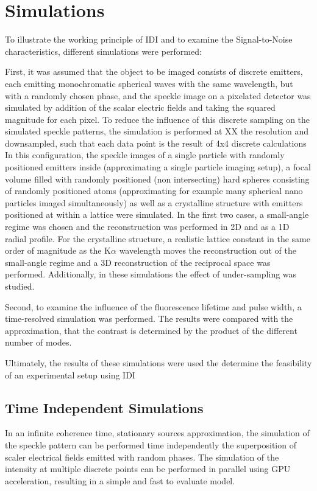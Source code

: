 \chapter{Simulations}
\label{chap:simulation}
To illustrate the working principle of IDI and to examine the Signal-to-Noise  characteristics, different simulations were performed:

First, it was assumed that the object to be imaged consists of discrete emitters, each emitting monochromatic spherical waves with the same wavelength, but with a randomly chosen phase, and the speckle image on a pixelated detector was simulated by addition of the scalar electric fields and taking the squared magnitude for each pixel. To reduce the influence of this discrete sampling on the simulated speckle patterns, the simulation is performed at XX the resolution and downsampled, such that each data point is the result of 4x4 discrete calculations
In this configuration, the speckle images of a single particle with randomly positioned emitters inside (approximating a single particle imaging setup), a focal volume filled with randomly positioned (non intersecting) hard spheres consisting of randomly positioned atoms (approximating for example many spherical nano particles imaged simultaneously) as well as a crystalline structure with emitters positioned at within a lattice were simulated. In the first two cases, a small-angle regime was chosen and the reconstruction was performed in 2D and as a 1D radial profile. For the crystalline structure, a realistic lattice constant in the same order of magnitude as the K$\alpha$ wavelength moves the reconstruction out of the small-angle regime and a 3D reconstruction of the reciprocal space was performed.
Additionally, in these simulations the effect of under-sampling was studied.

Second, to examine the influence of the fluorescence lifetime and pulse width, a time-resolved simulation was performed.
The results were compared with the approximation, that the contrast is determined by the product of the different number of modes.

Ultimately, the results of these simulations were used the determine the feasibility of an experimental setup using IDI







\section{Time Independent Simulations}
In an infinite coherence time, stationary sources approximation, the simulation of the speckle pattern can be performed time independently the superposition of scaler electrical fields emitted with random phases. The simulation of the intensity at multiple discrete points can be performed in parallel using GPU acceleration, resulting in a simple and fast to evaluate model.







